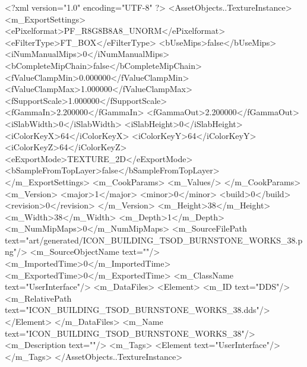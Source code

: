 <?xml version="1.0" encoding="UTF-8" ?>
<AssetObjects..TextureInstance>
	<m_ExportSettings>
		<ePixelformat>PF_R8G8B8A8_UNORM</ePixelformat>
		<eFilterType>FT_BOX</eFilterType>
		<bUseMips>false</bUseMips>
		<iNumManualMips>0</iNumManualMips>
		<bCompleteMipChain>false</bCompleteMipChain>
		<fValueClampMin>0.000000</fValueClampMin>
		<fValueClampMax>1.000000</fValueClampMax>
		<fSupportScale>1.000000</fSupportScale>
		<fGammaIn>2.200000</fGammaIn>
		<fGammaOut>2.200000</fGammaOut>
		<iSlabWidth>0</iSlabWidth>
		<iSlabHeight>0</iSlabHeight>
		<iColorKeyX>64</iColorKeyX>
		<iColorKeyY>64</iColorKeyY>
		<iColorKeyZ>64</iColorKeyZ>
		<eExportMode>TEXTURE_2D</eExportMode>
		<bSampleFromTopLayer>false</bSampleFromTopLayer>
	</m_ExportSettings>
	<m_CookParams>
		<m_Values/>
	</m_CookParams>
	<m_Version>
		<major>1</major>
		<minor>0</minor>
		<build>0</build>
		<revision>0</revision>
	</m_Version>
	<m_Height>38</m_Height>
	<m_Width>38</m_Width>
	<m_Depth>1</m_Depth>
	<m_NumMipMaps>0</m_NumMipMaps>
	<m_SourceFilePath text="art/generated/ICON_BUILDING_TSOD_BURNSTONE_WORKS_38.png"/>
	<m_SourceObjectName text=""/>
	<m_ImportedTime>0</m_ImportedTime>
	<m_ExportedTime>0</m_ExportedTime>
	<m_ClassName text="UserInterface"/>
	<m_DataFiles>
		<Element>
			<m_ID text="DDS"/>
			<m_RelativePath text="ICON_BUILDING_TSOD_BURNSTONE_WORKS_38.dds"/>
		</Element>
	</m_DataFiles>
	<m_Name text="ICON_BUILDING_TSOD_BURNSTONE_WORKS_38"/>
	<m_Description text=""/>
	<m_Tags>
		<Element text="UserInterface"/>
	</m_Tags>
</AssetObjects..TextureInstance>
